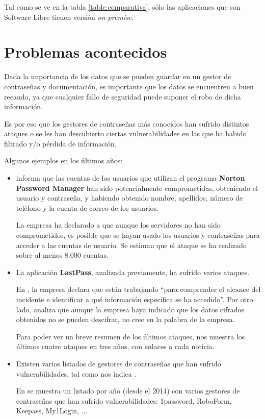 \documentclass{\ClassPath/viu-tfm-template}
\begin{document}
Tal como se ve en la tabla \ref{table:comparativa}, sólo las aplicaciones que son Software Libre tienen versión \textit{on premise}.


\section{Problemas acontecidos}

Dada la importancia de los datos que se pueden guardar en un gestor de contraseñas y documentación, es importante que los datos se encuentren a buen recaudo, ya que cualquier fallo de seguridad puede suponer el robo de dicha información.

Es por eso que los gestores de contraseñas más conocidos han sufrido distintos ataques o se les han descubierto ciertas vulnerabilidades en las que ha habido filtrado y/o pérdida de información.

Algunos ejemplos en los últimos años:

\begin{itemize}
    \item \textcite{norton} informa que las cuentas de los usuarios que utilizan el programa \textbf{Norton Password Manager} han sido potencialmente comprometidas, obteniendo el usuario y contraseña, y habiendo obtenido nombre, apellidos, número de teléfono y la cuenta de correo de los usuarios.

    La empresa ha declarado a \textcite{norton2} que aunque los servidores no han sido comprometidos, es posible que se hayan usado los usuarios y contraseñas para acceder a las cuentas de usuario. Se estiman que el ataque se ha realizado sobre al menos 8.000 cuentas.

    \item La aplicación \textbf{LastPass}, analizada previamente, ha sufrido varios ataques.

    En \textcite{lastpass}, la empresa declara que están trabajando “para comprender el alcance del incidente e identificar a qué información específica se ha accedido”. Por otro lado, \textcite{lastpass2} analiza que aunque la empresa haya indicado que los datos cifrados obtenidos no se pueden descifrar, no cree en la palabra de la empresa.

    Para poder ver un breve resumen de los últimos ataques, \textcite{lastpass3} nos muestra los últimos cuatro ataques en tres años, con enlaces a cada noticia.

    \item Existen varios listados de gestores de contraseñas que han sufrido vulnerabilidades, tal como nos indica \textcite{hacked2}.

    En \textcite{hacked} se muestra un listado por año (desde el 2014) con varios gestores de contraseñas que han sufrido vulnerabilidades: 1password, RoboForm, Keepass, My1Login, ...

\end{itemize}
\end{document}
